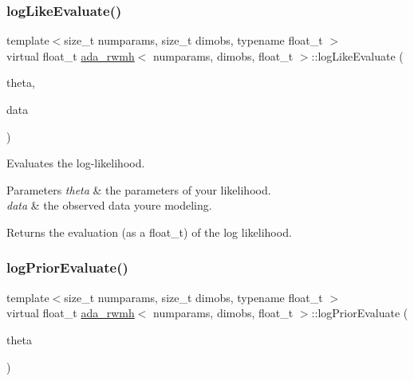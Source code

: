\subsubsection{\texorpdfstring{log\+Like\+Evaluate()}{logLikeEvaluate()}}
{\footnotesize\ttfamily template$<$size\+\_\+t numparams, size\+\_\+t dimobs, typename float\+\_\+t $>$ \\
virtual float\+\_\+t \hyperlink{classada__rwmh}{ada\+\_\+rwmh}$<$ numparams, dimobs, float\+\_\+t $>$\+::log\+Like\+Evaluate (\begin{DoxyParamCaption}\item[{const \hyperlink{classparamPack}{param\+Pack}$<$ float\+\_\+t $>$ \&}]{theta,  }\item[{const std\+::vector$<$ osv $>$ \&}]{data }\end{DoxyParamCaption})\hspace{0.3cm}{\ttfamily [pure virtual]}}



Evaluates the log-\/likelihood. 


\begin{DoxyParams}{Parameters}
{\em theta} & the parameters of your likelihood. \\
\hline
{\em data} & the observed data you\textquotesingle{}re modeling. \\
\hline
\end{DoxyParams}
\begin{DoxyReturn}{Returns}
the evaluation (as a float\+\_\+t) of the log likelihood. 
\end{DoxyReturn}
\mbox{\label{classada__rwmh_a859004bc1e241d55fbb3f072cf43d994}} 
\subsubsection{\texorpdfstring{log\+Prior\+Evaluate()}{logPriorEvaluate()}}
{\footnotesize\ttfamily template$<$size\+\_\+t numparams, size\+\_\+t dimobs, typename float\+\_\+t $>$ \\
virtual float\+\_\+t \hyperlink{classada__rwmh}{ada\+\_\+rwmh}$<$ numparams, dimobs, float\+\_\+t $>$\+::log\+Prior\+Evaluate (\begin{DoxyParamCaption}\item[{const \hyperlink{classparamPack}{param\+Pack}$<$ float\+\_\+t $>$ \&}]{theta }\end{DoxyParamCaption})\hspace{0.3cm}{\ttfamily [pure virtual]}}



